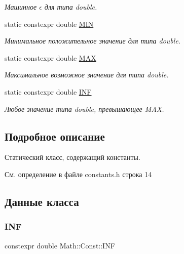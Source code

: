 \begin{DoxyCompactItemize}
\begin{DoxyCompactList}\small\item\em Машинное $\epsilon$ для типа double. \end{DoxyCompactList}\item 
static constexpr double \hyperlink{class_math_1_1_const_a787c7176528a33522741da6b45761378}{M\+IN}
\begin{DoxyCompactList}\small\item\em Минимальное положительное значение для типа double. \end{DoxyCompactList}\item 
static constexpr double \hyperlink{class_math_1_1_const_aa6f0fbdf83bf388173d9712c2a9d2046}{M\+AX}
\begin{DoxyCompactList}\small\item\em Максимальное возможное значение для типа double. \end{DoxyCompactList}\item 
static constexpr double \hyperlink{class_math_1_1_const_a66b00ab50323d42c344eb25a680f1918}{I\+NF}
\begin{DoxyCompactList}\small\item\em Любое значение типа double, превышающее M\+AX. \end{DoxyCompactList}\end{DoxyCompactItemize}


\subsection{Подробное описание}
Статический класс, содержащий константы. 

См. определение в файле constants.\+h строка 14



\subsection{Данные класса}
\hypertarget{class_math_1_1_const_a66b00ab50323d42c344eb25a680f1918}{}\label{class_math_1_1_const_a66b00ab50323d42c344eb25a680f1918} 
\subsubsection{\texorpdfstring{I\+NF}{INF}}
{\footnotesize\ttfamily constexpr double Math\+::\+Const\+::\+I\+NF\hspace{0.3cm}{\ttfamily [static]}}

